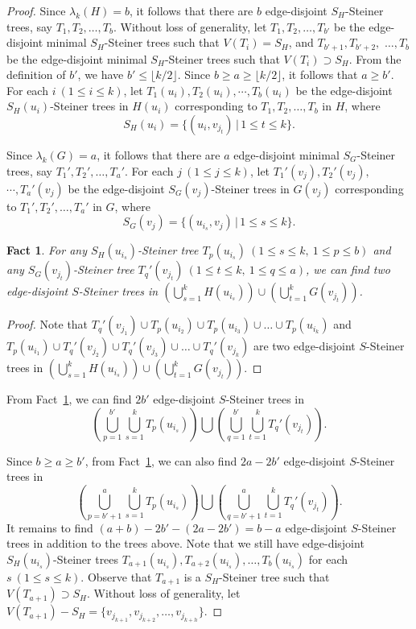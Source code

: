 \documentclass[10pt,a4paper]{amsart}
\newtheorem{fact}{Fact}
\begin{document}
\begin{proof}
Since $\lambda_k(H)=b$, it follows that there are $b$ edge-disjoint
$S_H$-Steiner trees, say $T_1, T_2,\ldots, T_b$. Without loss of
generality, let $T_1, T_2,\ldots, T_{b'}$ be the edge-disjoint
minimal $S_H$-Steiner trees such that $V(T_i)=S_H$, and $T_{b'+1},
T_{b'+2},$ $\ldots, T_{b}$ be the edge-disjoint minimal
$S_H$-Steiner trees such that $V(T_i)\supset S_H$. From the definition
of $b'$, we have $b'\leq \lfloor k/2\rfloor$. Since $b\geq a\geq
\lfloor k/2\rfloor$, it follows that $a\geq b'$. For each $i \
(1\leq i\leq k)$, let $T_1(u_i), T_2(u_i), \cdots, T_{b}(u_i)$ be
the edge-disjoint $S_H(u_i)$-Steiner trees in $H(u_i)$ corresponding
to $T_1, T_2,\ldots, T_{b}$ in $H$, where
\[
S_H(u_i)=\{(u_i,v_{j_t})\,|\,1\leq t\leq k\}.
\]


Since $\lambda_k(G)=a$, it follows that there are $a$ edge-disjoint
minimal $S_G$-Steiner trees, say $T_1', T_2',\ldots, T_a'$. For each
$j \ (1\leq j\leq k)$, let $T_1'(v_j), T_2'(v_j),$ $ \cdots,
T_{a}'(v_j)$ be the edge-disjoint $S_G(v_j)$-Steiner trees in
$G(v_j)$ corresponding to $T_1', T_2',\ldots, T_{a}'$ in $G$, where
\[
S_G(v_j)=\{(u_{i_s},v_j)\,|\,1\leq s\leq k\}.
\]


\begin{fact}\label{fact1}
For any $S_H(u_{i_s})$-Steiner tree $T_p(u_{i_s}) \ (1\leq s\leq k,
\ 1\leq p\leq b)$ and any $S_G(v_{j_t})$-Steiner tree $T_q'(v_{j_t})
\ (1\leq t\leq k, \ 1\leq q\leq a)$, we can find two edge-disjoint
$S$-Steiner trees in $(\bigcup_{s=1}^kH(u_{i_s}))\cup
(\bigcup_{t=1}^kG(v_{j_t}))$.
\end{fact}
\begin{proof}
Note that $T_q'(v_{j_1})\cup T_p(u_{i_2})\cup T_p(u_{i_3})\cup
\ldots \cup T_p(u_{i_k})$ and $T_p(u_{i_1})\cup T_q'(v_{j_2})\cup
T_q'(v_{j_3})\cup \ldots \cup T_q'(v_{j_k})$ are two edge-disjoint
$S$-Steiner trees in $(\bigcup_{s=1}^kH(u_{i_s}))\cup
(\bigcup_{t=1}^kG(v_{j_t}))$.
\end{proof}


From Fact~\ref{fact1}, we can find $2b'$ edge-disjoint $S$-Steiner
trees in
\[
\left(\bigcup_{p=1}^{b'}\bigcup_{s=1}^kT_p(u_{i_s})\right)\bigcup
\left(\bigcup_{q=1}^{b'}\bigcup_{t=1}^kT_q'(v_{j_t})\right).
\]


Since $b\geq a\geq b'$, from Fact~\ref{fact1}, we can also find
$2a-2b'$ edge-disjoint $S$-Steiner trees in
\[
\left(\bigcup_{p=b'+1}^{a}\bigcup_{s=1}^kT_p(u_{i_s})\right)\bigcup
\left(\bigcup_{q=b'+1}^{a}\bigcup_{t=1}^kT_q'(v_{j_t})\right).
\]
It remains to find $(a+b)-2b'-(2a-2b')=b-a$ edge-disjoint
$S$-Steiner trees in addition to the trees above. Note that we still have
edge-disjoint $S_H(u_{i_s})$-Steiner trees
$T_{a+1}(u_{i_s}),T_{a+2}(u_{i_s}),\ldots,T_{b}(u_{i_s})$ for each
$s \ (1\leq s\leq k)$. Observe that $T_{a+1}$ is a $S_H$-Steiner
tree such that $V(T_{a+1})\supset S_H$. Without loss of generality,
let $V(T_{a+1})-S_H=\{v_{j_{k+1}},v_{j_{k+2}},\ldots,v_{j_{k+h}}\}$.



\end{proof}
\end{document}
